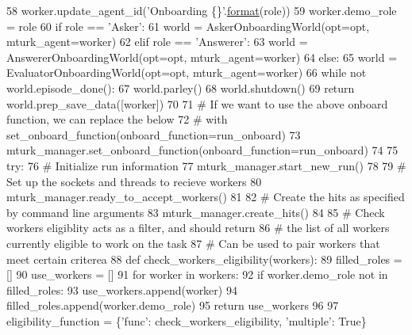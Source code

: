\begin{DoxyCode}
58         worker.update\_agent\_id(\textcolor{stringliteral}{'Onboarding \{\}'}.\hyperlink{namespaceparlai_1_1chat__service_1_1services_1_1messenger_1_1shared__utils_a32e2e2022b824fbaf80c747160b52a76}{format}(role))
59         worker.demo\_role = role
60         \textcolor{keywordflow}{if} role == \textcolor{stringliteral}{'Asker'}:
61             world = AskerOnboardingWorld(opt=opt, mturk\_agent=worker)
62         \textcolor{keywordflow}{elif} role == \textcolor{stringliteral}{'Answerer'}:
63             world = AnswererOnboardingWorld(opt=opt, mturk\_agent=worker)
64         \textcolor{keywordflow}{else}:
65             world = EvaluatorOnboardingWorld(opt=opt, mturk\_agent=worker)
66         \textcolor{keywordflow}{while} \textcolor{keywordflow}{not} world.episode\_done():
67             world.parley()
68         world.shutdown()
69         \textcolor{keywordflow}{return} world.prep\_save\_data([worker])
70 
71     \textcolor{comment}{# If we want to use the above onboard function, we can replace the below}
72     \textcolor{comment}{# with set\_onboard\_function(onboard\_function=run\_onboard)}
73     mturk\_manager.set\_onboard\_function(onboard\_function=run\_onboard)
74 
75     \textcolor{keywordflow}{try}:
76         \textcolor{comment}{# Initialize run information}
77         mturk\_manager.start\_new\_run()
78 
79         \textcolor{comment}{# Set up the sockets and threads to recieve workers}
80         mturk\_manager.ready\_to\_accept\_workers()
81 
82         \textcolor{comment}{# Create the hits as specified by command line arguments}
83         mturk\_manager.create\_hits()
84 
85         \textcolor{comment}{# Check workers eligiblity acts as a filter, and should return}
86         \textcolor{comment}{# the list of all workers currently eligible to work on the task}
87         \textcolor{comment}{# Can be used to pair workers that meet certain criterea}
88         \textcolor{keyword}{def }check\_workers\_eligibility(workers):
89             filled\_roles = []
90             use\_workers = []
91             \textcolor{keywordflow}{for} worker \textcolor{keywordflow}{in} workers:
92                 \textcolor{keywordflow}{if} worker.demo\_role \textcolor{keywordflow}{not} \textcolor{keywordflow}{in} filled\_roles:
93                     use\_workers.append(worker)
94                     filled\_roles.append(worker.demo\_role)
95             \textcolor{keywordflow}{return} use\_workers
96 
97         eligibility\_function = \{\textcolor{stringliteral}{'func'}: check\_workers\_eligibility, \textcolor{stringliteral}{'multiple'}: \textcolor{keyword}{True}\}

\end{DoxyCode}
